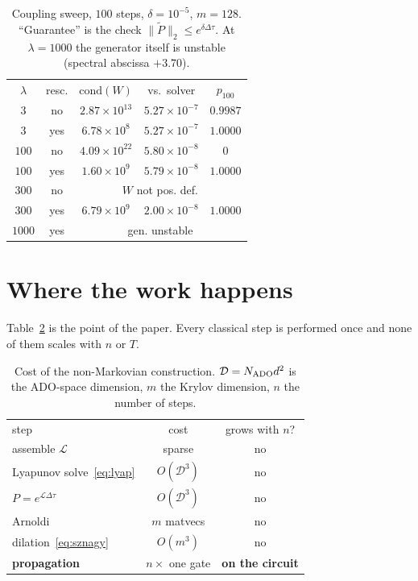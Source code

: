 \documentclass[aps,prx,twocolumn,superscriptaddress,nofootinbib,longbibliography]{revtex4-2}
\theoremstyle{plain}
\newcommand{\norm}[1]{\lVert#1\rVert}
\begin{document}
\begin{table}[t]
\caption{Coupling sweep, $100$ steps, $\delta=10^{-5}$, $m=128$.  ``Guarantee''
is the check $\norm{\tilde P}_2\le e^{\delta\Delta\tau}$.  At $\lambda=1000$ the
generator itself is unstable (spectral abscissa $+3.70$).}
\label{tab:sweep}

\begin{ruledtabular}
\begin{tabular}{ccccc}
$\lambda$ & resc. & $\mathrm{cond}(W)$ & vs.\ solver & $p_{100}$\\
\colrule
$3$    & no  & $2.87\times10^{13}$ & $5.27\times10^{-7}$ & $0.9987$\\
$3$    & yes & $6.78\times10^{8}$  & $5.27\times10^{-7}$ & $1.0000$\\
$100$  & no  & $4.09\times10^{22}$ & $5.80\times10^{-8}$ & $0$\\
$100$  & yes & $1.60\times10^{9}$  & $5.79\times10^{-8}$ & $1.0000$\\
$300$  & no  & \multicolumn{3}{c}{$W$ not pos. def.}\\
$300$  & yes & $6.79\times10^{9}$  & $2.00\times10^{-8}$ & $1.0000$\\
$1000$ & yes & \multicolumn{3}{c}{gen. unstable}\\
\end{tabular}
\end{ruledtabular}
\end{table}

\section{Where the work happens}
\label{sec:cost}

Table~\ref{tab:cost} is the point of the paper.  Every classical step is
performed once and none of them scales with $n$ or $T$.

\begin{table}[t]
\caption{Cost of the non-Markovian construction.  $\mathcal D=N_{\rm ADO}d^2$ is
the ADO-space dimension, $m$ the Krylov dimension, $n$ the number of steps.}
\label{tab:cost}
\begin{ruledtabular}
\begin{tabular}{lcc}
step & cost & grows with $n$?\\
\colrule
assemble $\mathcal L$ & sparse & no\\
Lyapunov solve~\eqref{eq:lyap} & $O(\mathcal D^3)$ & no\\
$P=e^{\mathcal L\Delta\tau}$ & $O(\mathcal D^3)$ & no\\
Arnoldi & $m$ matvecs & no\\
dilation~\eqref{eq:sznagy} & $O(m^3)$ & no\\
\textbf{propagation} & $n\times$ one gate & \textbf{on the circuit}\\
\end{tabular}
\end{ruledtabular}
\end{table}
\end{document}
